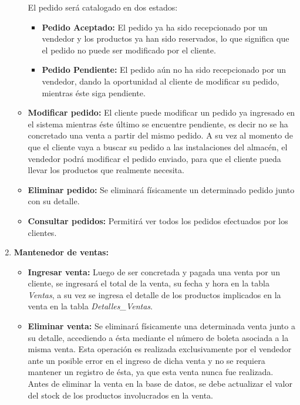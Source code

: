 \documentclass[letterpaper,12pt]{article}
\begin{document}
\begin{enumerate}
\begin{itemize}
El pedido será catalogado en dos estados:
\begin{itemize}
\item \textbf{Pedido Aceptado:} El pedido ya ha sido recepcionado por un vendedor y los productos ya han sido reservados, lo que significa que el pedido no puede ser modificado por el cliente.
\item \textbf{Pedido Pendiente:} El pedido aún no ha sido recepcionado por un vendedor, dando la oportunidad al cliente de modificar su pedido, mientras éste siga pendiente.
\end{itemize}

\item \textbf{Modificar pedido:}
El cliente puede modificar un pedido ya ingresado en el sistema mientras éste último se encuentre pendiente, es decir
no se ha concretado una venta a partir del mismo pedido. A su vez al momento de que el cliente vaya a buscar su pedido
a las instalaciones del almacén, el vendedor podrá modificar el pedido enviado, para que el cliente pueda llevar 
los productos que realmente necesita.

\item \textbf{Eliminar pedido:}
Se eliminará físicamente un determinado pedido junto con su detalle.

\item \textbf{Consultar pedidos:}
Permitirá ver todos los pedidos efectuados por los clientes.
\end{itemize}

\newpage

\item \textbf{Mantenedor de ventas:} 

\begin{itemize}
\item \textbf{Ingresar venta: }
Luego de ser concretada y pagada una venta por un cliente, se ingresará el total de la venta, su fecha y hora en la tabla 
\emph{Ventas}, a su vez se ingresa el detalle de los productos implicados en la venta en la tabla \emph{Detalles\_Ventas}. 

\item \textbf{Eliminar venta: }
Se eliminará físicamente una determinada venta junto a su detalle, accediendo a ésta mediante el número de boleta asociada a la misma venta.
Esta operación es realizada exclusivamente por el vendedor ante un posible error en el ingreso de dicha venta y no se requiera mantener un 
registro de ésta, ya que esta venta nunca fue realizada.
Antes de eliminar la venta en la base de datos, se debe actualizar el valor del stock de los productos involucrados en la venta.


\end{itemize}
\end{enumerate}
\end{document}

